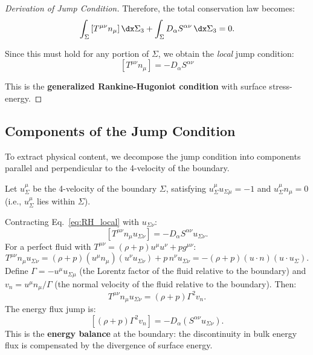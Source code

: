 \begin{proof}[Derivation of Jump Condition]
Therefore, the total conservation law becomes:
\begin{equation}
\label{eq:total_conservation}
\int_\Sigma \left[ T^{\mu\nu} n_\mu \right] \dx \Sigma_3 + \int_\Sigma D_\alpha S^{\alpha\nu} \, \dx \Sigma_3 = 0.
\end{equation}

Since this must hold for any portion of $\Sigma$, we obtain the \emph{local} jump condition:
\begin{equation}
\label{eq:RH_local}
\boxed{\left[ T^{\mu\nu} n_\mu \right] = -D_\alpha S^{\alpha\nu}}
\end{equation}

This is the \textbf{generalized Rankine-Hugoniot condition} with surface stress-energy.
\end{proof}

\subsection{Components of the Jump Condition}
\label{app:RH_components}

To extract physical content, we decompose the jump condition into components parallel and perpendicular to the 4-velocity of the boundary.

\begin{definition}
Let $u^\mu_\Sigma$ be the 4-velocity of the boundary $\Sigma$, satisfying $u^\mu_\Sigma u_{\Sigma\mu} = -1$ and $u^\mu_\Sigma n_\mu = 0$ (i.e., $u^\mu_\Sigma$ lies within $\Sigma$).
\end{definition}

\begin{proposition}
\label{prop:energy_jump}
Contracting Eq.~\eqref{eq:RH_local} with $u_{\Sigma\nu}$:
\begin{equation}
\label{eq:energy_jump}
\left[ T^{\mu\nu} n_\mu u_{\Sigma\nu} \right] = -D_\alpha S^{\alpha\nu} u_{\Sigma\nu}.
\end{equation}
For a perfect fluid with $T^{\mu\nu} = (\rho + p) u^\mu u^\nu + p g^{\mu\nu}$:
\begin{equation}
\label{eq:energy_jump_perfect}
T^{\mu\nu} n_\mu u_{\Sigma\nu} = (\rho + p)(u^\mu n_\mu)(u^\nu u_{\Sigma\nu}) + p \, n^\nu u_{\Sigma\nu} = -(\rho + p)(u \cdot n)(u \cdot u_\Sigma).
\end{equation}
Define $\Gamma = -u^\mu u_{\Sigma\mu}$ (the Lorentz factor of the fluid relative to the boundary) and $v_n = u^\mu n_\mu / \Gamma$ (the normal velocity of the fluid relative to the boundary). Then:
\begin{equation}
\label{eq:energy_flux}
T^{\mu\nu} n_\mu u_{\Sigma\nu} = (\rho + p) \Gamma^2 v_n.
\end{equation}
The energy flux jump is:
\begin{equation}
\label{eq:energy_conservation}
\left[ (\rho + p) \Gamma^2 v_n \right] = -D_\alpha (S^{\alpha\nu} u_{\Sigma\nu}).
\end{equation}
This is the \textbf{energy balance} at the boundary: the discontinuity in bulk energy flux is compensated by the divergence of surface energy.
\end{proposition}

